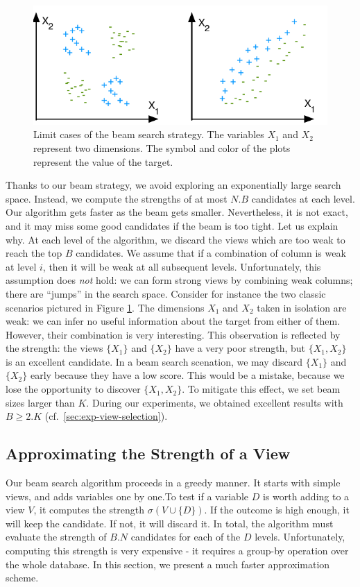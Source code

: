 \begin{figure}[t!]
\centering
\includegraphics[width=0.8\columnwidth]{images/strength-jump}
\caption{Limit cases of the beam search strategy. The variables $X_1$ and
$X_2$ represent two dimensions. The symbol and color of the plots represent
the value of the target. }
\label{pic:strength-jump}
\end{figure}
Thanks to our beam strategy, we avoid exploring an exponentially large search
space. Instead, we compute the strengths of at most $N.B$ candidates at each
level. Our algorithm gets faster as the beam gets smaller.  Nevertheless, it is
not exact, and it may miss some good candidates if the beam is too tight. Let
us explain why. At each level of the algorithm, we discard the views which are
too weak to reach the top $B$ candidates. We assume that if a combination of
column is weak at level $i$, then it will be weak at all subsequent levels.
Unfortunately, this assumption does \emph{not} hold: we can form strong views by
combining weak columns; there are ``jumps'' in the search space.
Consider for instance the two classic scenarios pictured in Figure
\ref{pic:strength-jump}.  The dimensions $X_1$ and $X_2$ taken in isolation are
weak: we can infer no useful information about the target from either of them.
However, their combination is very interesting.  This observation is reflected
by the strength: the views $\{X_1\}$ and $\{X_2\}$ have a very poor strength,
but $\{X_1, X_2\}$ is an excellent candidate. In a beam search scenation, we
may discard $\{X_1\}$ and $\{X_2\}$ early because they have a low score.  This
would be a mistake, because we lose the opportunity to discover $\{X_1, X_2\}$.
To mitigate this effect, we set beam sizes larger than $K$.  During our
experiments, we obtained excellent results with $B \geq 2.K$
(cf.~\ref{sec:exp-view-selection}).


\subsection{Approximating the Strength of a View}
\label{sec:approximate}
Our beam search algorithm proceeds in a greedy manner. It starts with simple
views, and adds variables one by one.To test if a variable $D$ is worth adding
to a view $V$, it computes the strength $\sigma(V \cup \{D\})$. If the outcome
is high enough, it will keep the candidate. If not, it will discard it.  In
total, the algorithm must evaluate the strength of $B.N$ candidates for each of
the $D$ levels.  Unfortunately, computing this strength is very expensive - it
requires a group-by operation over the whole database. In this section, we
present a much faster approximation scheme.
 
